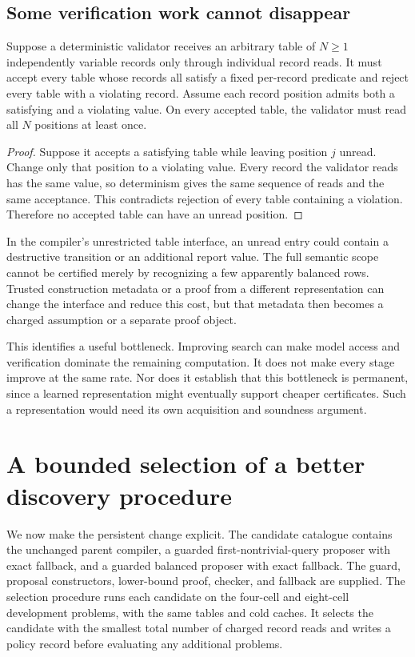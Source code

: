 \subsection{Some verification work cannot disappear}
\begin{SIIproposition}\label{SII:prop:table-floor}
Suppose a deterministic validator receives an arbitrary table of $N\geq1$ independently variable records only through individual record reads. It must accept every table whose records all satisfy a fixed per-record predicate and reject every table with a violating record. Assume each record position admits both a satisfying and a violating value. On every accepted table, the validator must read all $N$ positions at least once.
\end{SIIproposition}
\begin{proof}
Suppose it accepts a satisfying table while leaving position $j$ unread. Change only that position to a violating value. Every record the validator reads has the same value, so determinism gives the same sequence of reads and the same acceptance. This contradicts rejection of every table containing a violation. Therefore no accepted table can have an unread position.
\end{proof}

In the compiler's unrestricted table interface, an unread entry could contain a destructive transition or an additional report value. The full semantic scope cannot be certified merely by recognizing a few apparently balanced rows. Trusted construction metadata or a proof from a different representation can change the interface and reduce this cost, but that metadata then becomes a charged assumption or a separate proof object.

This identifies a useful bottleneck. Improving search can make model access and verification dominate the remaining computation. It does not make every stage improve at the same rate. Nor does it establish that this bottleneck is permanent, since a learned representation might eventually support cheaper certificates. Such a representation would need its own acquisition and soundness argument.

\section{A bounded selection of a better discovery procedure}\label{SII:sec:method-selection}
We now make the persistent change explicit. The candidate catalogue contains the unchanged parent compiler, a guarded first-nontrivial-query proposer with exact fallback, and a guarded balanced proposer with exact fallback. The guard, proposal constructors, lower-bound proof, checker, and fallback are supplied. The selection procedure runs each candidate on the four-cell and eight-cell development problems, with the same tables and cold caches. It selects the candidate with the smallest total number of charged record reads and writes a policy record before evaluating any additional problems.

